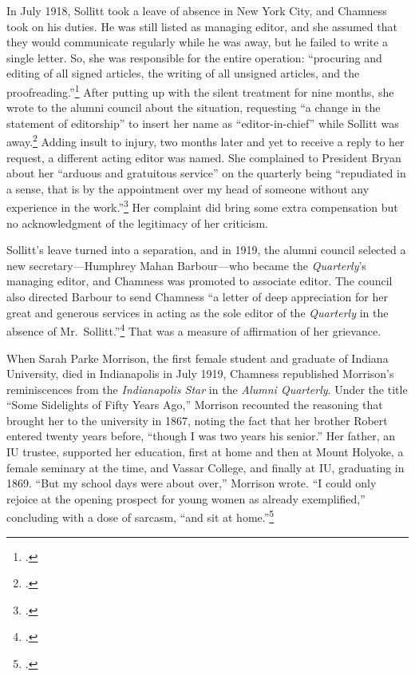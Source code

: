 \documentclass[
  american,
  letterpaper,
]{scrreprt}
\begin{document}
In July 1918, Sollitt took a leave of absence in New York City, and
Chamness took on his duties. He was still listed as managing editor, and
she assumed that they would communicate regularly while he was away, but
he failed to write a single letter. So, she was responsible for the
entire operation: ``procuring and editing of all signed articles, the
writing of all unsigned articles, and the proofreading.''\footnote{.} After putting up with the silent treatment for nine
months, she wrote to the alumni council about the situation, requesting
``a change in the statement of editorship'' to insert her name as
``editor-in-chief'' while Sollitt was away.\footnote{.} Adding insult to injury, two months later and yet to
receive a reply to her request, a different acting editor was named. She
complained to President Bryan about her ``arduous and gratuitous
service'' on the quarterly being ``repudiated in a sense, that is by the
appointment over my head of someone without any experience in the
work.''\footnote{.}
Her complaint did bring some extra compensation but no acknowledgment of
the legitimacy of her criticism.

Sollitt's leave turned into a separation, and in 1919, the alumni
council selected a new secretary---Humphrey Mahan Barbour---who became
the \emph{Quarterly}'s managing editor, and Chamness was promoted to
associate editor. The council also directed Barbour to send Chamness ``a
letter of deep appreciation for her great and generous services in
acting as the sole editor of the \emph{Quarterly} in the absence of
Mr.~Sollitt.''\footnote{.} That was a measure of affirmation of her grievance.

When Sarah Parke Morrison, the first female student and graduate of
Indiana University, died in Indianapolis in July 1919, Chamness
republished Morrison's reminiscences from the \emph{Indianapolis Star}
in the \emph{Alumni Quarterly}. Under the title ``Some Sidelights of
Fifty Years Ago,'' Morrison recounted the reasoning that brought her to
the university in 1867, noting the fact that her brother Robert entered
twenty years before, ``though I was two years his senior.'' Her father,
an IU trustee, supported her education, first at home and then at Mount
Holyoke, a female seminary at the time, and Vassar College, and finally
at IU, graduating in 1869. ``But my school days were about over,''
Morrison wrote. ``I could only rejoice at the opening prospect for young
women as already exemplified,'' concluding with a dose of sarcasm, ``and
sit at home.''\footnote{.}
\end{document}
